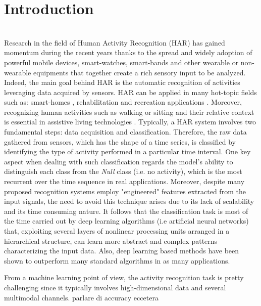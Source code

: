 
\section{Introduction}
\label{sec:introduction}

\\

Research in the field of Human Activity Recognition (HAR) has gained momentum during the recent years thanks to the spread and widely adoption of powerful mobile devices, smart-watches, smart-bands and other wearable or non-wearable equipments that together create a rich sensory input to be analyzed. Indeed, the main goal behind HAR is the automatic recognition of activities leveraging data acquired by sensors. HAR can be applied in many hot-topic fields such as: smart-homes \cite{Rashidi-2009}, rehabilitation \cite{Patel-2012} and recreation applications \cite{Lara-2013}. Moreover, recognizing human activities such as walking or sitting and their relative context is essential in assistive living technologies \cite{Avci-2010}. Typically, a HAR system involves two fundamental steps: data acquisition and classification. Therefore, the raw data gathered from sensors, which has the shape of a time series, is classified by identifying the type of activity performed in a particular time interval.  One key aspect when dealing with such classification regards the model's ability to distinguish each class from the \textit{Null} class (i.e. no activity), which is the most recurrent over the time sequence in real applications. Moreover, despite many proposed recognition systems employ "engineered" features extracted from the input signals, the need to avoid this technique arises due to its lack of scalability and its time consuming nature. It follows that the classification task is most of the time carried out by deep learning algorithms (i.e artificial neural networks) that, exploiting several layers of nonlinear processing units arranged in a hierarchical structure, can learn more abstract and complex patterns characterizing the input data. Also, deep learning based methods have been shown to outperform many standard algorithms in as many applications.

From a machine learning point of view, the activity recognition task is pretty challenging since it typically involves high-dimensional data and several multimodal channels.  parlare di accuracy eccetera


